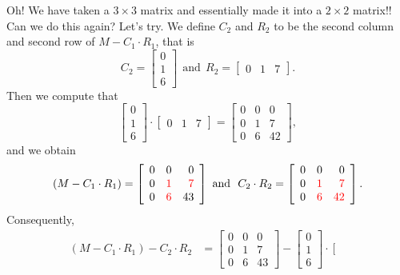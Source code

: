 \begin{example}
Oh! We have taken a $3 \times 3$ matrix and essentially made it into a $2 \times 2 $ matrix!! Can we do this again? Let's try. We define $C_2$  and $R_2$  to be the second column and second row of $M- C_1 \cdot R_1$, that is
$$C_2=\left[\begin{array}{r} 
    0  \\ 1 \\ 6  \end{array}  \right]~~\text{and}~~R_2=\left[\begin{array}{rrr} 
   0   &  1   &  7 \end{array}  \right].  $$
 Then we compute that 
$$
 \left[\begin{array}{r} 
    0  \\ 1 \\ 6  \end{array}  \right] \cdot \left[\begin{array}{rrr} 
   0   &  1   &  7 \end{array}  \right] = \left[\begin{array}{rrr} 
       0  &   0  &   0 \\
     0   &  1   &  7 \\
     0   &  6   & 42 \end{array}  \right],
$$
 and we obtain
 $$
\left(M - C_1 \cdot R_1 \right) = \left[\begin{array}{rrr} 
       0  &   0  &   0 \\
     0   & \color{red} 1   &  \color{red} 7 \\
     0   &  \color{red} 6   & 43 \end{array}  \right] \text{ and~~} C_2 \cdot R_2 = \left[\begin{array}{rrr} 
       0  &   0  &   0 \\
     0   &  \color{red} 1   & \color{red}  7 \\
     0   & \color{red}  6   & \color{red} 42 \end{array}  \right]. 
 $$
Consequently, 
   \begin{align*} 
\left(M - C_1 \cdot R_1 \right)  -  C_2 \cdot R_2 &= \left[\begin{array}{rrr} 
       0  &   0  &   0 \\
     0   &  1   &  7 \\
     0   &  6   & 43 \end{array}  \right] -  \left[\begin{array}{r} 
    0  \\ 1 \\ 6  \end{array}  \right] \cdot \left[\begin{array}{rrr} 

\end{array}
\end{align*}
\end{example}
